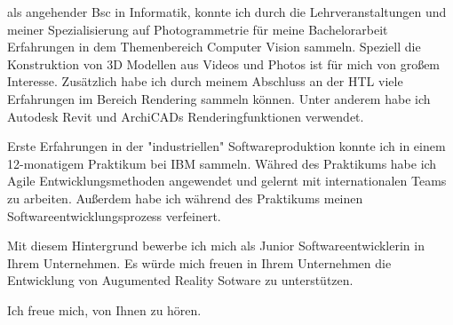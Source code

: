 \documentclass[11pt,stdletter,sigleft,dateno]{newlfm}
\begin{document}
\begin{newlfm}
als angehender Bsc in Informatik, konnte ich durch die Lehrveranstaltungen und meiner Spezialisierung auf Photogrammetrie für meine Bachelorarbeit Erfahrungen in dem Themenbereich Computer Vision sammeln. Speziell die Konstruktion von 3D Modellen aus Videos und Photos ist für mich von großem Interesse. Zusätzlich habe ich durch meinem Abschluss an der HTL viele Erfahrungen im Bereich Rendering sammeln können. Unter anderem habe ich Autodesk Revit und ArchiCADs Renderingfunktionen verwendet.

Erste Erfahrungen in der "industriellen" Softwareproduktion konnte ich in einem 12-monatigem Praktikum bei IBM sammeln. Währed des Praktikums habe ich Agile Entwicklungsmethoden angewendet und gelernt mit internationalen Teams zu arbeiten. Außerdem habe ich während des Praktikums meinen Softwareentwicklungsprozess verfeinert.

Mit diesem Hintergrund bewerbe ich mich als Junior Softwareentwicklerin in Ihrem Unternehmen. Es würde mich freuen in Ihrem Unternehmen die Entwicklung von Augumented Reality Sotware zu unterstützen.

Ich freue mich, von Ihnen zu hören.\\
\end{newlfm}
\end{document}
